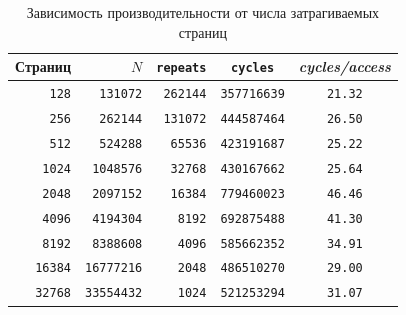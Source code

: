 \begin{table}[H]
\caption{Зависимость производительности от числа затрагиваемых страниц}
\label{tab:tlb}
\small
\begin{tabularx}{\textwidth}{|r|r|r|C|C|}
	\hline
	Страниц & $N$ & \texttt{repeats} & \texttt{cycles} & \textit{cycles/access} \\
	\hline
	\texttt{128} & \texttt{131072} & \texttt{262144} & \texttt{357716639} & \texttt{21.32} \\
	\hline
	\texttt{256} & \texttt{262144} & \texttt{131072} & \texttt{444587464} & \texttt{26.50} \\
	\hline
	\texttt{512} & \texttt{524288} & \texttt{65536} & \texttt{423191687} & \texttt{25.22} \\
	\hline
	\texttt{1024} & \texttt{1048576} & \texttt{32768} & \texttt{430167662} & \texttt{25.64} \\
	\hline
	\texttt{2048} & \texttt{2097152} & \texttt{16384} & \texttt{779460023} & \texttt{46.46} \\
	\hline
	\texttt{4096} & \texttt{4194304} & \texttt{8192} & \texttt{692875488} & \texttt{41.30} \\
	\hline
	\texttt{8192} & \texttt{8388608} & \texttt{4096} & \texttt{585662352} & \texttt{34.91} \\
	\hline
	\texttt{16384} & \texttt{16777216} & \texttt{2048} & \texttt{486510270} & \texttt{29.00} \\
	\hline
	\texttt{32768} & \texttt{33554432} & \texttt{1024} & \texttt{521253294} & \texttt{31.07} \\
	\hline
\end{tabularx}
\end{table}

